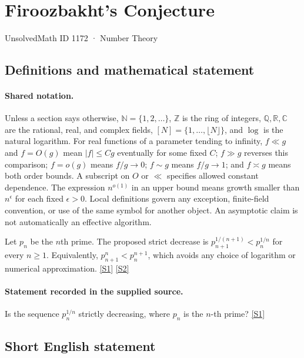 \documentclass[11pt,a4paper]{article}
\newcommand{\N}{\mathbb{N}}
\newcommand{\Z}{\mathbb{Z}}
\newcommand{\Q}{\mathbb{Q}}
\newcommand{\R}{\mathbb{R}}
\newcommand{\C}{\mathbb{C}}
\newcommand{\sref}[2]{\hyperlink{source:#1:#2}{[S#2]}}
\begin{document}

\setcounter{section}{1171}

\section{Firoozbakht's Conjecture}\label{1172}

{\small\sffamily UnsolvedMath ID 1172 · Number Theory}

\subsection{Definitions and mathematical statement}

\paragraph{Shared notation.}Unless a section says otherwise, $\N=\{1,2,\ldots\}$,
$\Z$ is the ring of integers, $\Q,\R,\C$ are the rational, real, and complex
fields, $[N]=\{1,\ldots,\lfloor N\rfloor\}$, and $\log$ is the natural
logarithm. For real functions of a parameter tending to infinity,
$f\ll g$ and $f=O(g)$ mean $|f|\leq Cg$ eventually for some fixed $C$;
$f\gg g$ reverses this comparison; $f=o(g)$ means $f/g\to0$;
$f\sim g$ means $f/g\to1$; and $f\asymp g$ means both order bounds.
A subscript on $O$ or $\ll$ specifies allowed constant dependence.
The expression $n^{o(1)}$ in an upper bound means growth smaller than
$n^\epsilon$ for each fixed $\epsilon>0$. Local definitions govern any
exception, finite-field convention, or use of the same symbol for another
object. An asymptotic claim is not automatically an effective algorithm.



Let $p_n$ be the $n$th prime. The proposed strict decrease is $p_{n+1}^{1/(n+1)}<p_n^{1/n}$ for every $n\geq1$. Equivalently, $p_{n+1}^n<p_n^{n+1}$, which avoids any choice of logarithm or numerical approximation. \sref{1172}{1} \sref{1172}{2}

\paragraph{Statement recorded in the supplied source.}
Is the sequence $p_n^{1/n}$ strictly decreasing, where $p_n$ is the $n$-th prime? \sref{1172}{1}

\subsection{Short English statement}
\end{document}
